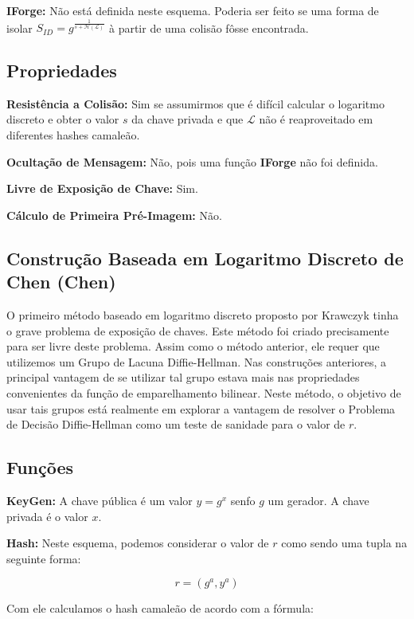\documentclass[a4paper]{article}
\begin{document}
\textbf{IForge:} Não está definida neste esquema. Poderia ser feito se
uma forma de isolar $S_{ID} =
g^{\frac{1}{s+\mathcal{H}(\mathcal{L})}}$ à partir de uma colisão
fôsse encontrada.

\subsection{Propriedades}

\textbf{Resistência a Colisão: }Sim se assumirmos que é difícil
calcular o logaritmo discreto e obter o valor $s$ da chave privada e
que $\mathcal{L}$ não é reaproveitado em diferentes hashes camaleão.

\textbf{Ocultação de Mensagem: }Não, pois uma função \textbf{IForge}
não foi definida.

\textbf{Livre de Exposição de Chave: } Sim.

\textbf{Cálculo de Primeira Pré-Imagem: }Não.

\subsection{Construção Baseada em Logaritmo Discreto de Chen (Chen)
  \cite{chen}}

O primeiro método baseado em logaritmo discreto proposto por Krawczyk
tinha o grave problema de exposição de chaves. Este método foi criado
precisamente para ser livre deste problema. Assim como o método
anterior, ele requer que utilizemos um Grupo de Lacuna
Diffie-Hellman. Nas construções anteriores, a principal vantagem de se
utilizar tal grupo estava mais nas propriedades convenientes da função
de emparelhamento bilinear. Neste método, o objetivo de usar tais
grupos está realmente em explorar a vantagem de resolver o Problema de
Decisão Diffie-Hellman como um teste de sanidade para o valor de $r$.

\subsection{Funções}

\textbf{KeyGen: }A chave pública é um valor $y=g^x$ senfo $g$ um
gerador. A chave privada é o valor $x$.

\textbf{Hash: }Neste esquema, podemos considerar o valor de $r$ como
sendo uma tupla na seguinte forma:

$$
r = (g^a, y^a)
$$

Com ele calculamos o hash camaleão de acordo com a fórmula:
\end{document}
